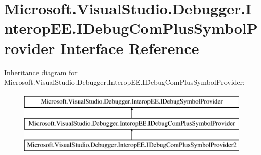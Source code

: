 \hypertarget{interface_microsoft_1_1_visual_studio_1_1_debugger_1_1_interop_e_e_1_1_i_debug_com_plus_symbol_provider}{\section{Microsoft.\+Visual\+Studio.\+Debugger.\+Interop\+E\+E.\+I\+Debug\+Com\+Plus\+Symbol\+Provider Interface Reference}
\label{interface_microsoft_1_1_visual_studio_1_1_debugger_1_1_interop_e_e_1_1_i_debug_com_plus_symbol_provider}
}
Inheritance diagram for Microsoft.\+Visual\+Studio.\+Debugger.\+Interop\+E\+E.\+I\+Debug\+Com\+Plus\+Symbol\+Provider\+:\begin{figure}[H]
\begin{center}
\leavevmode
\includegraphics[height=3.000000cm]{interface_microsoft_1_1_visual_studio_1_1_debugger_1_1_interop_e_e_1_1_i_debug_com_plus_symbol_provider}
\end{center}
\end{figure}
